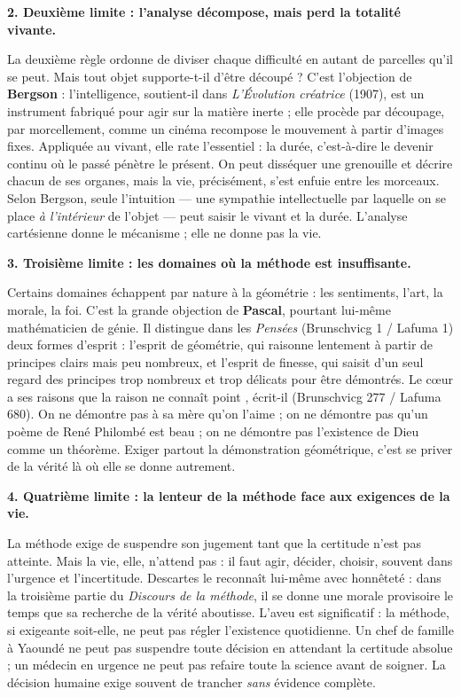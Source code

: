 \documentclass[11pt]{article}
\newcommand{\cle}[1]{{\popxbold\color{popdark}#1}}
\begin{document}
\textbf{2. Deuxième limite : l'analyse décompose, mais perd la totalité vivante.}\par
La deuxième règle ordonne de diviser chaque difficulté en autant de parcelles qu'il se peut. Mais tout objet supporte-t-il d'être découpé ? C'est l'objection de \textbf{Bergson} : l'intelligence, soutient-il dans \emph{L'Évolution créatrice} (1907), est un instrument fabriqué pour agir sur la matière inerte ; elle procède par découpage, par morcellement, comme un cinéma recompose le mouvement à partir d'images fixes. Appliquée au vivant, elle rate l'essentiel : la \cle{durée}, c'est-à-dire le devenir continu où le passé pénètre le présent. On peut disséquer une grenouille et décrire chacun de ses organes, mais la vie, précisément, s'est enfuie entre les morceaux. Selon Bergson, seule l'\cle{intuition} — une sympathie intellectuelle par laquelle on se place \emph{à l'intérieur} de l'objet — peut saisir le vivant et la durée. L'analyse cartésienne donne le mécanisme ; elle ne donne pas la vie.

\textbf{3. Troisième limite : les domaines où la méthode est insuffisante.}\par
Certains domaines échappent par nature à la géométrie : les sentiments, l'art, la morale, la foi. C'est la grande objection de \textbf{Pascal}, pourtant lui-même mathématicien de génie. Il distingue dans les \emph{Pensées} (Brunschvicg 1 / Lafuma 1) deux formes d'esprit : l'\cle{esprit de géométrie}, qui raisonne lentement à partir de principes clairs mais peu nombreux, et l'\cle{esprit de finesse}, qui saisit d'un seul regard des principes trop nombreux et trop délicats pour être démontrés. \guillemotleft Le cœur a ses raisons que la raison ne connaît point \guillemotright, écrit-il (Brunschvicg 277 / Lafuma 680). On ne démontre pas à sa mère qu'on l'aime ; on ne démontre pas qu'un poème de René Philombé est beau ; on ne démontre pas l'existence de Dieu comme un théorème. Exiger partout la démonstration géométrique, c'est se priver de la vérité là où elle se donne autrement.

\textbf{4. Quatrième limite : la lenteur de la méthode face aux exigences de la vie.}\par
La méthode exige de suspendre son jugement tant que la certitude n'est pas atteinte. Mais la vie, elle, n'attend pas : il faut agir, décider, choisir, souvent dans l'urgence et l'incertitude. Descartes le reconnaît lui-même avec honnêteté : dans la troisième partie du \emph{Discours de la méthode}, il se donne une \cle{morale provisoire} le temps que sa recherche de la vérité aboutisse. L'aveu est significatif : la méthode, si exigeante soit-elle, ne peut pas régler l'existence quotidienne. Un chef de famille à Yaoundé ne peut pas suspendre toute décision en attendant la certitude absolue ; un médecin en urgence ne peut pas refaire toute la science avant de soigner. La décision humaine exige souvent de trancher \emph{sans} évidence complète.
\end{document}
